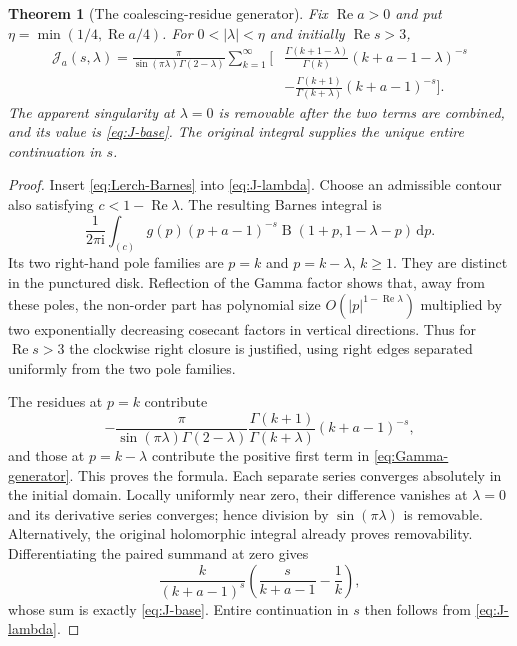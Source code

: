 \documentclass[11pt]{article}
\numberwithin{equation}{section}
\newtheorem{theorem}{Theorem}[section]
\theoremstyle{definition}
\DeclareMathOperator{\Rea}{Re}
\DeclareMathOperator{\B}{B}
\newcommand{\dd}{\,\mathrm d}
\newcommand{\ii}{\mathrm i}
\newcommand{\JJ}{\mathcal J}
\begin{document}
\begin{theorem}[The coalescing-residue generator]\label{thm:Gamma-generator}
Fix $\Rea a>0$ and put $\eta=\min(1/4,\Rea a/4)$. For $0<|\lambda|<\eta$ and initially $\Rea s>3$,
\begin{equation}\label{eq:Gamma-generator}
 \begin{split}
 \JJ_a(s,\lambda)=\frac{\pi}{\sin(\pi\lambda)\Gamma(2-\lambda)}
 \sum_{k=1}^\infty\Bigg[&
 \frac{\Gamma(k+1-\lambda)}{\Gamma(k)}(k+a-1-\lambda)^{-s}\\
 &-\frac{\Gamma(k+1)}{\Gamma(k+\lambda)}(k+a-1)^{-s}\Bigg].
 \end{split}
\end{equation}
The apparent singularity at $\lambda=0$ is removable after the two terms are combined, and its value is \eqref{eq:J-base}. The original integral supplies the unique entire continuation in $s$.
\end{theorem}
\begin{proof}
Insert \eqref{eq:Lerch-Barnes} into \eqref{eq:J-lambda}. Choose an admissible contour also satisfying $c<1-\Rea\lambda$. The resulting Barnes integral is
\begin{equation}\label{eq:J-single-Barnes}
 \frac1{2\pi\ii}\int_{(c)}
 g(p)(p+a-1)^{-s}\B(1+p,1-\lambda-p)\dd p.
\end{equation}
Its two right-hand pole families are $p=k$ and $p=k-\lambda$, $k\ge1$. They are distinct in the punctured disk. Reflection of the Gamma factor shows that, away from these poles, the non-order part has polynomial size $O(|p|^{1-\Rea\lambda})$ multiplied by two exponentially decreasing cosecant factors in vertical directions. Thus for $\Rea s>3$ the clockwise right closure is justified, using right edges separated uniformly from the two pole families.

The residues at $p=k$ contribute
\[
 -\frac{\pi}{\sin(\pi\lambda)\Gamma(2-\lambda)}
 \frac{\Gamma(k+1)}{\Gamma(k+\lambda)}(k+a-1)^{-s},
\]
and those at $p=k-\lambda$ contribute the positive first term in \eqref{eq:Gamma-generator}. This proves the formula. Each separate series converges absolutely in the initial domain. Locally uniformly near zero, their difference vanishes at $\lambda=0$ and its derivative series converges; hence division by $\sin(\pi\lambda)$ is removable. Alternatively, the original holomorphic integral already proves removability. Differentiating the paired summand at zero gives
\[
 \frac{k}{(k+a-1)^s}\left(\frac{s}{k+a-1}-\frac1k\right),
\]
whose sum is exactly \eqref{eq:J-base}. Entire continuation in $s$ then follows from \eqref{eq:J-lambda}.
\end{proof}
\end{document}
